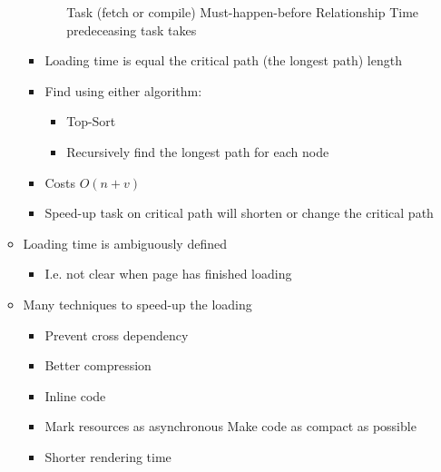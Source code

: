 \begin{itemize}
\begin{itemize}
\begin{itemize}
\begin{itemize}
                             Task (fetch or compile)
                             Must-happen-before Relationship
                             Time predeceasing task takes
                        \end{itemize}
                    \item Loading time is equal the critical path (the longest path) length
                    \item Find using either algorithm:
                        \begin{itemize}
                            \item Top-Sort
                            \item Recursively find the longest path for each node
                        \end{itemize}
                    \item Costs $O(n + v)$
                    \item Speed-up task on critical path will shorten or change the critical path
                \end{itemize}
            \item Loading time is ambiguously defined
                \begin{itemize}
                    \item I.e. not clear when page has finished loading
                \end{itemize}
        \end{itemize}
        \begin{itemize}
            \item Many techniques to speed-up the loading
                \begin{itemize}
                    \item Prevent cross dependency
                    \item Better compression
                    \item Inline code
                    \item Mark resources as asynchronous
                         Make code as compact as possible
                \end{itemize}
                \begin{itemize}
                    \item Shorter rendering time
                \end{itemize}

\end{itemize}
\end{itemize}

